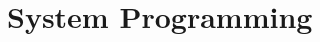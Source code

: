 \clearpage
\thispagestyle{empty}
\vspace*{1.45in}
\part{System Programming}\label{part:system-programming}
\vspace*{\fill}
\clearpage
